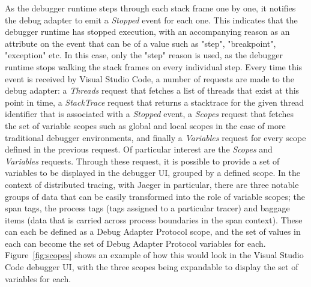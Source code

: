 \documentclass[12pt,pdftex,titlepage]{report}
\begin{document}
            As the debugger runtime steps through each stack frame one by one, it notifies the debug adapter to emit a \textit{Stopped} event for each one. This indicates that the debugger runtime has stopped execution, with an accompanying reason 
            as an attribute on the event that can be of a value such as "step", "breakpoint", "exception" etc. In this case, only the "step" reason is used, as the debugger runtime stops walking the stack frames on every individual step. Every time
            this event is received by Visual Studio Code, a number of requests are made to the debug adapter: a \textit{Threads} request that fetches a list of threads that exist at this point in time, a \textit{StackTrace} request that returns
            a stacktrace for the given thread identifier that is associated with a \textit{Stopped} event, a \textit{Scopes} request that fetches the set of variable scopes such as global and local scopes in the case of more traditional debugger
            environments, and finally a \textit{Variables} request for every scope defined in the previous request. Of particular interest are the \textit{Scopes} and \textit{Variables} requests. Through these request, it is possible to provide a 
            set of variables to be displayed in the debugger UI, grouped by a defined scope. In the context of distributed tracing, with Jaeger in particular, there are three notable groups of data that can be easily transformed into the role of
            variable scopes; the span tags, the process tags (tags assigned to a particular tracer) and baggage items (data that is carried across process boundaries in the span context). These can each be defined as a Debug Adapter Protocol scope,
            and the set of values in each can become the set of Debug Adapter Protocol variables for each. Figure~\ref{fig:scopes} shows an example of how this would look in the Visual Studio Code debugger UI, with the three scopes being expandable
            to display the set of variables for each. 
\end{document}
